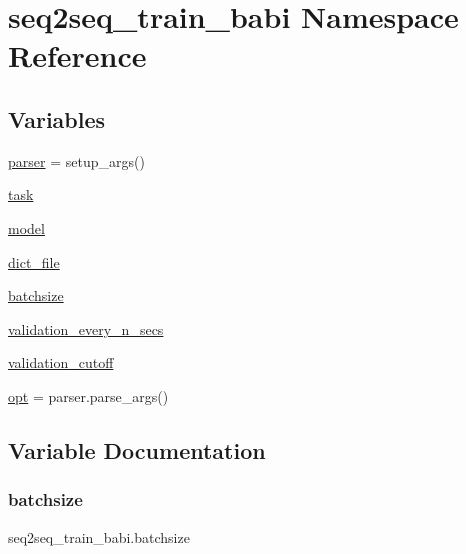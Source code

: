 \hypertarget{namespaceseq2seq__train__babi}{}\section{seq2seq\+\_\+train\+\_\+babi Namespace Reference}
\label{namespaceseq2seq__train__babi}
\subsection*{Variables}
\begin{DoxyCompactItemize}
\item 
\hyperlink{namespaceseq2seq__train__babi_a115c06fb282df0680f290de2e0cce605}{parser} = setup\+\_\+args()
\item 
\hyperlink{namespaceseq2seq__train__babi_aab701f2ffdd44169d27e821f385efc4d}{task}
\item 
\hyperlink{namespaceseq2seq__train__babi_a9b046813cd6bad230e39e884bd53f2fb}{model}
\item 
\hyperlink{namespaceseq2seq__train__babi_aea4b9f622282ecddd20c817a8a5b54a9}{dict\+\_\+file}
\item 
\hyperlink{namespaceseq2seq__train__babi_a793050eed570d62c050f2b5d09fb854b}{batchsize}
\item 
\hyperlink{namespaceseq2seq__train__babi_a708e61382d7aa58ee7d5fcc5a0dfb499}{validation\+\_\+every\+\_\+n\+\_\+secs}
\item 
\hyperlink{namespaceseq2seq__train__babi_ac50babad62a2fd00ad2617fe1f79d724}{validation\+\_\+cutoff}
\item 
\hyperlink{namespaceseq2seq__train__babi_a9c72abeb00defd44262466a19bc3b72a}{opt} = parser.\+parse\+\_\+args()
\end{DoxyCompactItemize}


\subsection{Variable Documentation}
\mbox{\label{namespaceseq2seq__train__babi_a793050eed570d62c050f2b5d09fb854b}} 
\subsubsection{\texorpdfstring{batchsize}{batchsize}}
{\footnotesize\ttfamily seq2seq\+\_\+train\+\_\+babi.\+batchsize}

